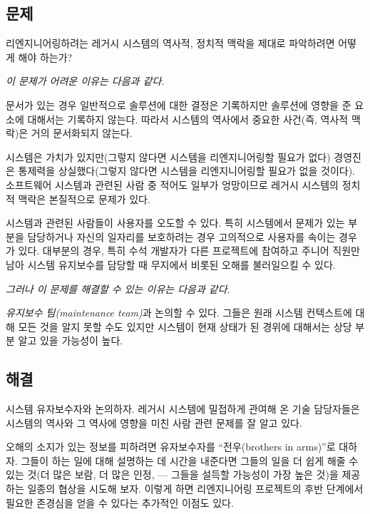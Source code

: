 \documentclass[a4paper,10pt,twoside]{book}
\begin{document}
\subsection*{문제}

리엔지니어링하려는 레거시 시스템의 역사적, 정치적 맥락을 제대로 파악하려면 어떻게 해야 하는가?

\emph{이 문제가 어려운 이유는 다음과 같다.}

\begin{bulletlist}
  \item 문서가 있는 경우 일반적으로 솔루션에 대한 결정은 기록하지만 솔루션에 영향을 준 요소에 대해서는 기록하지 않는다. 따라서 시스템의 역사에서 중요한 사건(즉, 역사적 맥락)은 거의 문서화되지 않는다.

  \item 시스템은 가치가 있지만(그렇지 않다면 시스템을 리엔지니어링할 필요가 없다) 경영진은 통제력을 상실했다(그렇지 않다면 시스템을 리엔지니어링할 필요가 없을 것이다). 소프트웨어 시스템과 관련된 사람 중 적어도 일부가 엉망이므로 레거시 시스템의 정치적 맥락은 본질적으로 문제가 있다.

  \item 시스템과 관련된 사람들이 사용자를 오도할 수 있다. 특히 시스템에서 문제가 있는 부분을 담당하거나 자신의 일자리를 보호하려는 경우 고의적으로 사용자를 속이는 경우가 있다. 대부분의 경우, 특히 수석 개발자가 다른 프로젝트에 참여하고 주니어 직원만 남아 시스템 유지보수를 담당할 때 무지에서 비롯된 오해를 불러일으킬 수 있다.

\end{bulletlist}

\emph{그러나 이 문제를 해결할 수 있는 이유는 다음과 같다.}

\begin{bulletlist}
  \item \emph{유지보수 팀(maintenance team)}과 논의할 수 있다. 그들은 원래 시스템 컨텍스트에 대해 모든 것을 알지 못할 수도 있지만 시스템이 현재 상태가 된 경위에 대해서는 상당 부분 알고 있을 가능성이 높다.
\end{bulletlist}

\subsection*{해결}

시스템 유자보수자와 논의하자. 레거시 시스템에 밀접하게 관여해 온 기술 담당자들은 시스템의 역사와 그 역사에 영향을 미친 사람 관련 문제를 잘 알고 있다.

오해의 소지가 있는 정보를 피하려면 유자보수자를 ``전우(brothers in arms)''로 대하자. 그들이 하는 일에 대해 설명하는 데 시간을 내준다면 그들의 일을 더 쉽게 해줄 수 있는 것(더 많은 보람, 더 많은 인정, --- 그들을 설득할 가능성이 가장 높은 것)을 제공하는 일종의 협상을 시도해 보자. 이렇게 하면 리엔지니어링 프로젝트의 후반 단계에서 필요한 존경심을 얻을 수 있다는 추가적인 이점도 있다.
\end{document}

